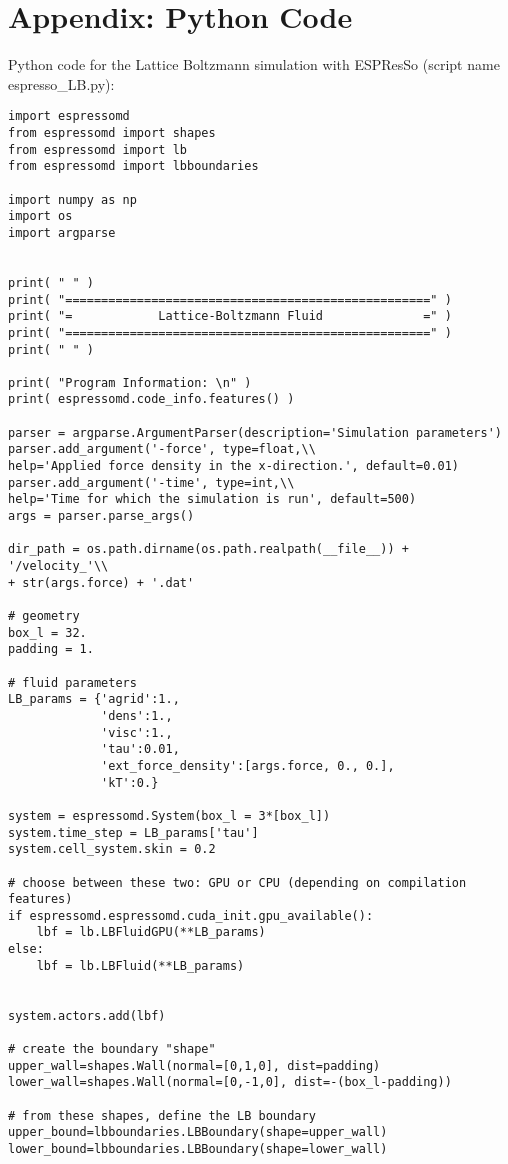 \documentclass[a4paper,10pt,bibtotoc]{scrartcl}
\begin{document}
\section{Appendix: Python Code}
Python code for the Lattice Boltzmann simulation with ESPResSo (script name espresso\_LB.py):
\begin{lstlisting}
import espressomd
from espressomd import shapes
from espressomd import lb
from espressomd import lbboundaries

import numpy as np
import os
import argparse


print( " " )
print( "===================================================" )
print( "=            Lattice-Boltzmann Fluid              =" )
print( "===================================================" )
print( " " )

print( "Program Information: \n" )
print( espressomd.code_info.features() )

parser = argparse.ArgumentParser(description='Simulation parameters')
parser.add_argument('-force', type=float,\\
help='Applied force density in the x-direction.', default=0.01)
parser.add_argument('-time', type=int,\\
help='Time for which the simulation is run', default=500)
args = parser.parse_args()

dir_path = os.path.dirname(os.path.realpath(__file__)) + '/velocity_'\\
+ str(args.force) + '.dat'

# geometry
box_l = 32.
padding = 1.

# fluid parameters
LB_params = {'agrid':1.,
             'dens':1.,
             'visc':1.,
             'tau':0.01,
             'ext_force_density':[args.force, 0., 0.],
             'kT':0.}
            
system = espressomd.System(box_l = 3*[box_l])
system.time_step = LB_params['tau']
system.cell_system.skin = 0.2

# choose between these two: GPU or CPU (depending on compilation features)
if espressomd.espressomd.cuda_init.gpu_available():
    lbf = lb.LBFluidGPU(**LB_params)
else:
    lbf = lb.LBFluid(**LB_params)


system.actors.add(lbf)

# create the boundary "shape"
upper_wall=shapes.Wall(normal=[0,1,0], dist=padding)
lower_wall=shapes.Wall(normal=[0,-1,0], dist=-(box_l-padding))

# from these shapes, define the LB boundary
upper_bound=lbboundaries.LBBoundary(shape=upper_wall)
lower_bound=lbboundaries.LBBoundary(shape=lower_wall)


\end{lstlisting}
\end{document}
